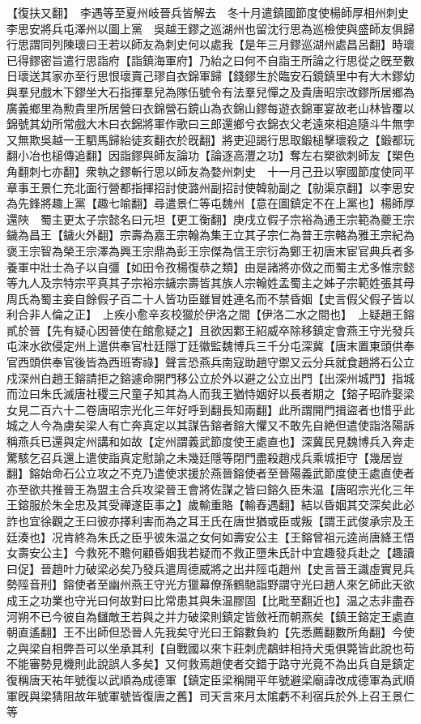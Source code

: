 【復扶又翻】　李遇等至夏州岐晉兵皆解去　冬十月遣鎮國節度使楊師厚相州刺史李思安將兵屯澤州以圖上黨　吳越王鏐之巡湖州也留沈行思為巡檢使與盛師友俱歸行思謂同列陳瓌曰王若以師友為刺史何以處我【是年三月鏐巡湖州處昌呂翻】時瓌已得鏐密旨遣行思詣府【詣鎮海軍府】乃紿之曰何不自詣王所論之行思從之旣至數日瓌送其家亦至行思恨瓌賣己璆自衣錦軍歸【錢鏐生於臨安石鏡鎮里中有大木鏐幼與羣兒戲木下鏐坐大石指揮羣兒為隊伍號令有法羣兒憚之及貴唐昭宗改鏐所居鄉為廣義鄉里為勲貴里所居營曰衣錦營石鏡山為衣錦山鏐每遊衣錦軍宴故老山林皆覆以錦號其幼所常戲大木曰衣錦將軍作歌曰三郎還鄉兮衣錦衣父老遠來相追隨斗牛無孛又無欺吳越一王駟馬歸紿徒亥翻衣於旣翻】將吏迎謁行思取鍛槌擊瓌殺之【鍛都玩翻小冶也槌傳追翻】因詣鏐與師友論功【論逐高灃之功】奪左右槊欲刺師友【槊色角翻刺七亦翻】衆執之鏐斬行思以師友為婺州刺史　十一月己丑以寧國節度使同平章事王景仁充北面行營都指揮招討使潞州副招討使韓勍副之【勍渠京翻】以李思安為先鋒將趣上黨【趣七喻翻】尋遣景仁等屯魏州【意在圖鎮定不在上黨也】楊師厚還陜　蜀主更太子宗懿名曰元坦【更工衡翻】庚戌立假子宗裕為通王宗範為夔王宗鐬為昌王【鐬火外翻】宗壽為嘉王宗翰為集王立其子宗仁為普王宗輅為雅王宗紀為褒王宗智為榮王宗澤為興王宗鼎為彭王宗傑為信王宗衍為鄭王初唐末宦官典兵者多養軍中壯士為子以自彊【如田令孜楊復恭之類】由是諸將亦傚之而蜀主尤多惟宗懿等九人及宗特宗平真其子宗裕宗鐬宗壽皆其族人宗翰姓孟蜀主之姊子宗範姓張其母周氏為蜀主妾自餘假子百二十人皆功臣雖冒姓連名而不禁昏姻【史言假父假子皆以利合非人倫之正】　上疾小愈辛亥校獵於伊洛之間【伊洛二水之間也】　上疑趙王鎔貳於晉【先有疑心因晉使在館愈疑之】且欲因鄴王紹威卒除移鎮定會燕王守光發兵屯淶水欲侵定州上遣供奉官杜廷隱丁廷徽監魏博兵三千分屯深冀【唐末置東頭供奉官西頭供奉官後皆為西班寄祿】聲言恐燕兵南寇助趙守禦又云分兵就食趙將石公立戍深州白趙王鎔請拒之鎔遽命開門移公立於外以避之公立出門【出深州城門】指城而泣曰朱氏滅唐社稷三尺童子知其為人而我王猶恃姻好以長者期之【鎔子昭祚娶梁女見二百六十二卷唐昭宗光化三年好呼到翻長知兩翻】此所謂開門揖盜者也惜乎此城之人今為虜矣梁人有亡奔真定以其謀告鎔者鎔大懼又不敢先自絶但遣使詣洛陽訴稱燕兵已還與定州講和如故【定州謂義武節度使王處直也】深冀民見魏博兵入奔走驚駭乞召兵還上遣使詣真定慰諭之未幾廷隱等閉門盡殺趙戍兵乘城拒守【幾居豈翻】鎔始命石公立攻之不克乃遣使求援於燕晉鎔使者至晉陽義武節度使王處直使者亦至欲共推晉王為盟主合兵攻梁晉王會將佐謀之皆曰鎔久臣朱温【唐昭宗光化三年王鎔服於朱全忠及其受禪遂臣事之】歲輸重賂【輸舂遇翻】結以昏姻其交深矣此必詐也宜徐觀之王曰彼亦擇利害而為之耳王氏在唐世猶或臣或叛【謂王武俊承宗及王廷湊也】况肯終為朱氏之臣乎彼朱温之女何如壽安公主【王鎔曾祖元逵尚唐絳王悟女壽安公主】今救死不贍何顧昏姻我若疑而不救正墮朱氏計中宜趣發兵赴之【趣讀曰促】晉趙叶力破梁必矣乃發兵遣周德威將之出井陘屯趙州【史言晉王識虛實見兵勢陘音刑】鎔使者至幽州燕王守光方獵幕僚孫鶴馳詣野謂守光曰趙人來乞師此天欲成王之功業也守光曰何故對曰比常患其與朱温膠固【比毗至翻近也】温之志非盡吞河朔不已今彼自為讎敵王若與之并力破梁則鎮定皆斂衽而朝燕矣【鎮王鎔定王處直朝直遙翻】王不出師但恐晉人先我矣守光曰王鎔數負約【先悉薦翻數所角翻】今使之與梁自相弊吾可以坐承其利【自戰國以來卞莊刺虎鷸蚌相持犬兎俱斃皆此說也苟不能審勢見機則此說誤人多矣】又何救焉趙使者交錯于路守光竟不為出兵自是鎮定復稱唐天祐年號復以武順為成德軍【鎮定臣梁稱開平年號避梁廟諱改成德軍為武順軍旣與梁猜阻故年號軍號皆復唐之舊】司天言來月太隂虧不利宿兵於外上召王景仁等

